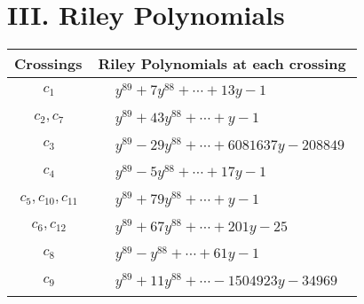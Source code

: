 \documentclass[1p]{elsarticle_modified}
\theoremstyle{definition}
\begin{document}
\centering \section*{ III. Riley Polynomials}
\begin{tabular}{m{50pt}|m{274pt}}
Crossings & \hspace{64pt}Riley Polynomials at each crossing \\
\hline $$\begin{aligned}c_{1}\end{aligned}$$&$\begin{aligned}
&y^{89}+7 y^{88}+\cdots+13 y-1
\end{aligned}$\\
\hline $$\begin{aligned}c_{2},c_{7}\end{aligned}$$&$\begin{aligned}
&y^{89}+43 y^{88}+\cdots+y-1
\end{aligned}$\\
\hline $$\begin{aligned}c_{3}\end{aligned}$$&$\begin{aligned}
&y^{89}-29 y^{88}+\cdots+6081637 y-208849
\end{aligned}$\\
\hline $$\begin{aligned}c_{4}\end{aligned}$$&$\begin{aligned}
&y^{89}-5 y^{88}+\cdots+17 y-1
\end{aligned}$\\
\hline $$\begin{aligned}c_{5},c_{10},c_{11}\end{aligned}$$&$\begin{aligned}
&y^{89}+79 y^{88}+\cdots+y-1
\end{aligned}$\\
\hline $$\begin{aligned}c_{6},c_{12}\end{aligned}$$&$\begin{aligned}
&y^{89}+67 y^{88}+\cdots+201 y-25
\end{aligned}$\\
\hline $$\begin{aligned}c_{8}\end{aligned}$$&$\begin{aligned}
&y^{89}- y^{88}+\cdots+61 y-1
\end{aligned}$\\
\hline $$\begin{aligned}c_{9}\end{aligned}$$&$\begin{aligned}
&y^{89}+11 y^{88}+\cdots-1504923 y-34969
\end{aligned}$\\
\hline
\end{tabular}
\vskip 2pc
\end{document}
